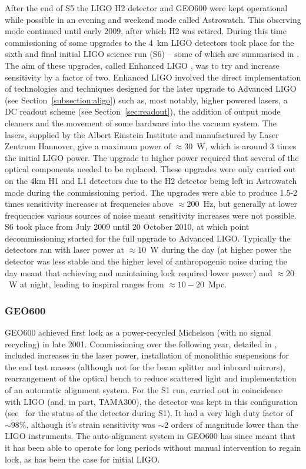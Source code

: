\documentclass{article}
\begin{document}
After the end of S5 the LIGO H2 detector and GEO600 were kept operational while
possible in an evening and weekend mode called Astrowatch. This observing mode
continued until early 2009, after which H2 was retired. During this time
commissioning of some upgrades to the 4~km LIGO detectors took place for the
sixth and final initial LIGO science run (S6) -- some of which are summarised in
\cite{Whitcomb:2008}. The aim of these upgrades, called Enhanced LIGO
\cite{EnhancedLIGO}, was to try and  increase sensitivity by a factor of two.
Enhanced LIGO involved the direct implementation of technologies and techniques
designed for the later upgrade to Advanced LIGO (see Section~\ref{subsection:aligo})
such as, most notably, higher powered lasers, a DC readout scheme (see
Section~\ref{sec:readout}), the addition of output mode cleaners and the movement of
some hardware into the vacuum system. The lasers, supplied by the Albert
Einstein Institute and manufactured by Laser Zentrum Hannover, give a maximum
power of $\approx30$~W, which is around 3 times the initial LIGO power. The
upgrade to higher power required that several of the optical components needed
to be replaced. These upgrades were only carried out on the 4km H1 and L1
detectors due to the H2 detector being left in Astrowatch mode during the
commissioning period. The upgrades were able to produce 1.5-2 times sensitivity
increases at frequencies above $\approx 200$~Hz, but generally at lower
frequencies various sources of noise meant sensitivity increases were not
possible. S6 took place from July 2009 until 20 October 2010, at which point
decommissioning started for the full upgrade to Advanced LIGO. Typically the
detectors ran with laser power at $\approx10$~W during the day (at higher power
the detector was less stable and the higher level of anthropogenic noise during
the day meant that achieving and maintaining lock required lower power) and
$\approx 20$~W at night, leading to inspiral ranges from $\approx 10-20$~Mpc.

\subsubsection{GEO600}

GEO600 achieved first lock as a power-recycled Michelson (with no signal
recycling) in late 2001. Commissioning over the following year, detailed in
\cite{Hewitson:2003}, included increases in the laser power, installation of
monolithic suspensions for the end test masses (although not for the beam
splitter and inboard mirrors), rearrangement of the optical bench to reduce
scattered light and implementation of an automatic alignment system. For the S1
run, carried out in coincidence with LIGO (and, in part, TAMA300), the detector
was kept in this configuration (see~\cite{Abbott:2004a} for the status of the
detector during S1). It had a very high duty factor of $\sim98\%$, although
it's strain sensitivity was $\sim2$ orders of magnitude lower than the LIGO
instruments. The auto-alignment system in GEO600 has since meant that it has
been able to operate for long periods without manual intervention to regain
lock, as has been the case for initial LIGO.
\end{document}
